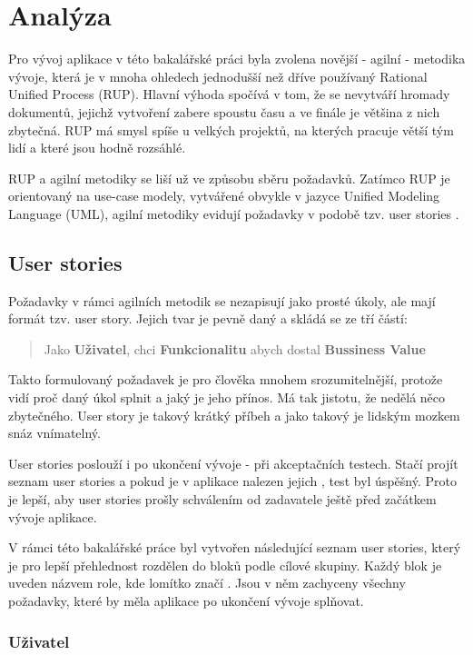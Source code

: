 \chapter{Analýza}

Pro vývoj aplikace v této bakalářské práci byla zvolena novější - agilní - metodika vývoje, která je v mnoha ohledech jednodušší než dříve používaný Rational Unified Process (RUP)\cite{rup}. Hlavní výhoda spočívá v tom, že se nevytváří hromady dokumentů, jejichž vytvoření zabere spoustu času a ve finále je většina z nich zbytečná. RUP má smysl spíše u velkých projektů, na kterých pracuje větší tým lidí a které jsou hodně rozsáhlé. 

RUP a agilní metodiky se liší už ve způsobu sběru požadavků. Zatímco RUP je orientovaný na use-case modely, vytvářené obvykle v jazyce Unified Modeling Language (UML)\cite{uml}, agilní metodiky evidují požadavky v podobě tzv. user stories \cite{userstory}.

\section{User stories}

Požadavky v rámci agilních metodik se nezapisují jako prosté úkoly, ale mají formát tzv. user story. Jejich tvar je pevně daný a skládá se ze tří částí:
\begin{quote}
Jako \textbf{Uživatel}, chci \textbf{Funkcionalitu} abych dostal \textbf{Bussiness Value}
\end{quote}

Takto formulovaný požadavek je pro člověka mnohem srozumitelnější, protože vidí proč daný úkol splnit a jaký je jeho přínos. Má tak jistotu, že nedělá něco zbytečného. User story je takový krátký příbeh a jako takový je lidským mozkem snáz vnímatelný.

User stories poslouží i po ukončení vývoje - při akceptačních testech. Stačí projít seznam user stories a pokud je v aplikace nalezen jejich , test byl úspěšný. Proto je lepší, aby user stories prošly schválením od zadavatele ještě před začátkem vývoje aplikace.

V rámci této bakalářské práce byl vytvořen následující seznam user stories, který je pro lepší přehlednost rozdělen do bloků podle cílové skupiny. Každý blok je uveden názvem role, kde lomítko značí . Jsou v něm zachyceny všechny požadavky, které by měla aplikace po ukončení vývoje splňovat.

\subsection{Uživatel}

